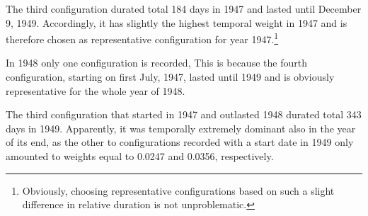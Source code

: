 The third configuration durated total 184 days in 1947 and lasted until December 9, 1949. Accordingly, it has slightly the highest temporal weight in 1947 and is therefore chosen as representative configuration for year 1947.\footnote{Obviously, choosing representative configurations based on such a slight difference in relative duration is not unproblematic.}

In 1948 only one configuration is recorded, This is because the fourth configuration, starting on first July, 1947, lasted until 1949 and is obviously representative for the whole year of 1948. 

The third configuration that started in 1947 and outlasted 1948 durated total 343 days in 1949. Apparently, it was temporally extremely dominant also in the year of its end, as the other to configurations recorded with a start date in 1949 only amounted to weights equal to 0.0247 and 0.0356, respectively.
